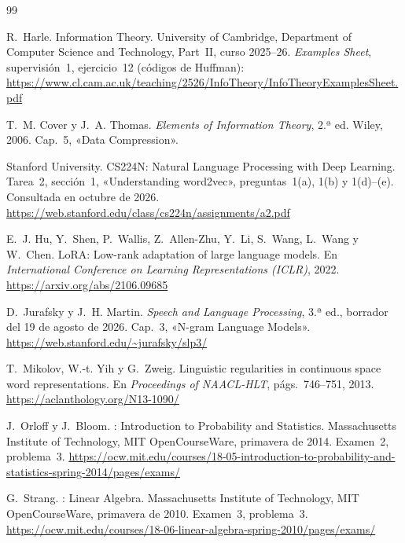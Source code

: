 \begin{thebibliography}{99}
\small

R.~Harle.
\newblock Information Theory.
\newblock University of Cambridge, Department of Computer Science and Technology, Part~II, curso 2025--26.
\newblock \emph{Examples Sheet}, supervisión~1, ejercicio~12 (códigos de Huffman): \url{https://www.cl.cam.ac.uk/teaching/2526/InfoTheory/InfoTheoryExamplesSheet.pdf}

T.~M. Cover y J.~A. Thomas.
\newblock \emph{Elements of Information Theory}, 2.ª ed.
\newblock Wiley, 2006.
\newblock Cap.~5, «Data Compression».

Stanford University.
\newblock CS224N: Natural Language Processing with Deep Learning. Tarea~2, sección~1, «Understanding word2vec», preguntas~1(a), 1(b) y 1(d)--(e).
\newblock Consultada en octubre de 2026.
\newblock \url{https://web.stanford.edu/class/cs224n/assignments/a2.pdf}

E.~J. Hu, Y.~Shen, P.~Wallis, Z.~Allen-Zhu, Y.~Li, S.~Wang, L.~Wang y W.~Chen.
\newblock LoRA: Low-rank adaptation of large language models.
\newblock En \emph{International Conference on Learning Representations (ICLR)}, 2022.
\newblock \url{https://arxiv.org/abs/2106.09685}

D.~Jurafsky y J.~H. Martin.
\newblock \emph{Speech and Language Processing}, 3.ª ed., borrador del 19 de agosto de 2026.
\newblock Cap.~3, «N-gram Language Models».
\newblock \url{https://web.stanford.edu/~jurafsky/slp3/}

T.~Mikolov, W.-t. Yih y G.~Zweig.
\newblock Linguistic regularities in continuous space word representations.
\newblock En \emph{Proceedings of NAACL-HLT}, págs.~746--751, 2013.
\newblock \url{https://aclanthology.org/N13-1090/}

J.~Orloff y J.~Bloom.
: Introduction to Probability and Statistics.
\newblock Massachusetts Institute of Technology, MIT OpenCourseWare, primavera de 2014. Examen~2, problema~3.
\newblock \url{https://ocw.mit.edu/courses/18-05-introduction-to-probability-and-statistics-spring-2014/pages/exams/}

G.~Strang.
: Linear Algebra.
\newblock Massachusetts Institute of Technology, MIT OpenCourseWare, primavera de 2010. Examen~3, problema~3.
\newblock \url{https://ocw.mit.edu/courses/18-06-linear-algebra-spring-2010/pages/exams/}

\end{thebibliography}
